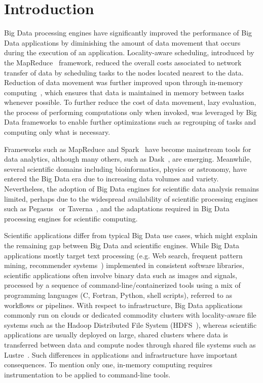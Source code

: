 \section{Introduction} %

Big Data processing engines have significantly improved the performance of Big Data
applications by diminishing the amount 
of data movement that occurs during the execution of an application. Locality-aware
scheduling, introduced by the MapReduce~\cite{dean2008mapreduce} framework, reduced the overall
costs associated to network transfer of data by scheduling tasks to the nodes located nearest to
the data. Reduction of data movement was further improved upon through in-memory computing~\cite{zaharia2016apache},
which ensures that data is maintained in memory between tasks whenever possible. To further
reduce the cost of data movement, lazy evaluation, the process of performing computations only when invoked,
was leveraged by Big Data frameworks to enable further optimizations such as regrouping of tasks and
computing only what is necessary.

Frameworks such as
MapReduce and Spark~\cite{zaharia2016apache} have become mainstream tools for data analytics, although many
others, such as Dask~\cite{rocklin2015dask}, are emerging.
Meanwhile, several scientific 
domains including bioinformatics, physics or astronomy, have entered 
the Big Data era due to increasing data volumes and variety. 
Nevertheless, the adoption of Big Data engines for scientific data analysis 
remains limited, perhaps due to the widespread availability of 
scientific processing engines such as Pegasus~\cite{deelman2005pegasus} or
Taverna~\cite{oinn2004taverna}, and the adaptations required in Big 
Data processing engines for scientific computing. 

Scientific applications differ from typical Big Data use 
cases, which might explain the remaining gap between Big Data and 
scientific engines. While Big Data applications mostly target text 
processing (e.g. Web search, frequent pattern mining, recommender 
systems~\cite{leskovec2014mining}) implemented in consistent software 
libraries, scientific applications often involve 
binary data such as images and signals, processed by a sequence of 
command-line/containerized tools
using a mix of programming languages (C, Fortran, Python, shell 
scripts), referred to as workflows or pipelines. With respect to infrastructure, 
Big Data applications commonly run on 
clouds or dedicated commodity clusters with locality-aware file systems 
such as the Hadoop Distributed File System 
(HDFS~\cite{shvachko2010hadoop}), whereas scientific applications are 
usually deployed on large, shared clusters where data is transferred between
data and compute nodes through shared file systems such 
as Lustre~\cite{schwan2003lustre}. Such differences in applications and 
infrastructure have important consequences. To 
mention only one, in-memory computing requires instrumentation to be 
applied to command-line tools. 


